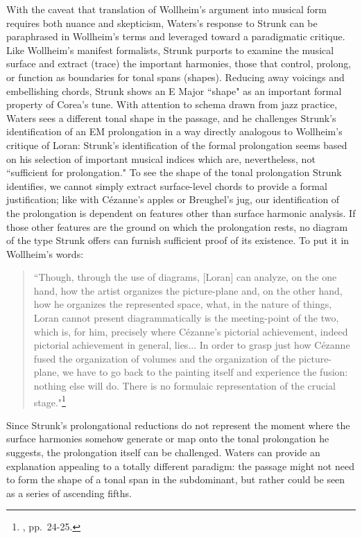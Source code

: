 With the caveat that translation of Wollheim's argument into musical form requires both nuance and skepticism, Waters's response to Strunk can be paraphrased in Wollheim's terms and leveraged toward a paradigmatic critique.  Like Wollheim's manifest formalists, Strunk purports to examine the musical surface and extract (trace) the important harmonies, those that control, prolong, or function as boundaries for tonal spans (shapes).  Reducing away voicings and embellishing chords, Strunk shows an E Major ``shape" as an important formal property of Corea's tune.  With attention to schema drawn from jazz practice, Waters sees a different tonal shape in the passage, and he challenges Strunk's identification of an EM prolongation in a way directly analogous to Wollheim's critique of Loran: Strunk's identification of the formal prolongation seems based on his selection of important musical indices which are, nevertheless, not ``sufficient for prolongation."  To see the shape of the tonal prolongation Strunk identifies, we cannot simply extract surface-level chords to provide a formal justification; like with C\'{e}zanne's apples or Breughel's jug, our identification of the prolongation is dependent on features other than surface harmonic analysis.  If those other features are the ground on which the prolongation rests, no diagram of the type Strunk offers can furnish sufficient proof of its existence.  To put it in Wollheim's words:
\begin{quote}
``Though, through the use of diagrams, [Loran] can analyze, on the one hand, how the artist organizes the picture-plane and, on the other hand, how he organizes the represented space, what, in the nature of things, Loran cannot present diagrammatically is the meeting-point of the two, which is, for him, precisely where C\'{e}zanne's pictorial achievement, indeed pictorial achievement in general, lies... In order to grasp just how C\'{e}zanne fused the organization of volumes and the organization of the picture-plane, we have to go back to the painting itself and experience the fusion: nothing else will do.  There is no formulaic representation of the crucial stage."\footnote{\cite{wollheim1995}, pp.\ 24-25.}
\end{quote}
Since Strunk's prolongational reductions do not represent the moment where the surface harmonies somehow generate or map onto the tonal prolongation he suggests, the prolongation itself can be challenged.  Waters can provide an explanation appealing to a totally different paradigm: the passage might not need to form the shape of a tonal span in the subdominant, but rather could be seen as a series of ascending fifths.

